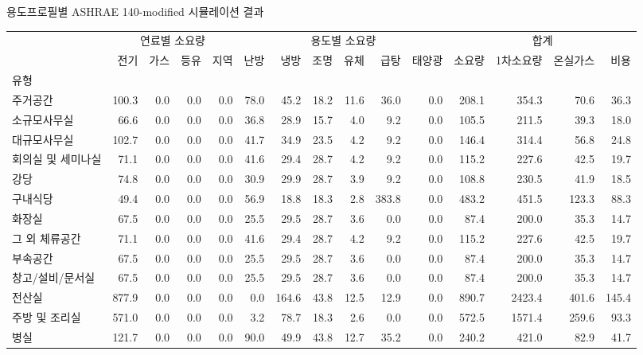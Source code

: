 \begin{defaulttable}
\tiny
\caption{용도프로필별 ASHRAE 140-modified 시뮬레이션 결과}

\begin{tabular}{lrrrrrrrrrrrrrr}
\toprule
 & \multicolumn{4}{|c}{연료별 소요량} & \multicolumn{6}{|c}{용도별 소요량} & \multicolumn{4}{|c}{합계} \\
 & 전기 & 가스 & 등유 & 지역 & 난방 & 냉방 & 조명 & 유체 & 급탕 & 태양광 & 소요량 & 1차소요량 & 온실가스 & 비용 \\
유형 &  &  &  &  &  &  &  &  &  &  &  &  &  &  \\
\midrule
주거공간 & 100.3 & 0.0 & 0.0 & 0.0 & 78.0 & 45.2 & 18.2 & 11.6 & 36.0 & 0.0 & 208.1 & 354.3 & 70.6 & 36.3 \\
소규모사무실 & 66.6 & 0.0 & 0.0 & 0.0 & 36.8 & 28.9 & 15.7 & 4.0 & 9.2 & 0.0 & 105.5 & 211.5 & 39.3 & 18.0 \\
대규모사무실 & 102.7 & 0.0 & 0.0 & 0.0 & 41.7 & 34.9 & 23.5 & 4.2 & 9.2 & 0.0 & 146.4 & 314.4 & 56.8 & 24.8 \\
회의실 및 세미나실 & 71.1 & 0.0 & 0.0 & 0.0 & 41.6 & 29.4 & 28.7 & 4.2 & 9.2 & 0.0 & 115.2 & 227.6 & 42.5 & 19.7 \\
강당 & 74.8 & 0.0 & 0.0 & 0.0 & 30.9 & 29.9 & 28.7 & 3.9 & 9.2 & 0.0 & 108.8 & 230.5 & 41.9 & 18.5 \\
구내식당 & 49.4 & 0.0 & 0.0 & 0.0 & 56.9 & 18.8 & 18.3 & 2.8 & 383.8 & 0.0 & 483.2 & 451.5 & 123.3 & 88.3 \\
화장실 & 67.5 & 0.0 & 0.0 & 0.0 & 25.5 & 29.5 & 28.7 & 3.6 & 0.0 & 0.0 & 87.4 & 200.0 & 35.3 & 14.7 \\
그 외 체류공간 & 71.1 & 0.0 & 0.0 & 0.0 & 41.6 & 29.4 & 28.7 & 4.2 & 9.2 & 0.0 & 115.2 & 227.6 & 42.5 & 19.7 \\
부속공간 & 67.5 & 0.0 & 0.0 & 0.0 & 25.5 & 29.5 & 28.7 & 3.6 & 0.0 & 0.0 & 87.4 & 200.0 & 35.3 & 14.7 \\
창고/설비/문서실 & 67.5 & 0.0 & 0.0 & 0.0 & 25.5 & 29.5 & 28.7 & 3.6 & 0.0 & 0.0 & 87.4 & 200.0 & 35.3 & 14.7 \\
전산실 & 877.9 & 0.0 & 0.0 & 0.0 & 0.0 & 164.6 & 43.8 & 12.5 & 12.9 & 0.0 & 890.7 & 2423.4 & 401.6 & 145.4 \\
주방 및 조리실 & 571.0 & 0.0 & 0.0 & 0.0 & 3.2 & 78.7 & 18.3 & 2.6 & 0.0 & 0.0 & 572.5 & 1571.4 & 259.6 & 93.3 \\
병실 & 121.7 & 0.0 & 0.0 & 0.0 & 90.0 & 49.9 & 43.8 & 12.7 & 35.2 & 0.0 & 240.2 & 421.0 & 82.9 & 41.7 \\

\end{tabular}
\end{defaulttable}
